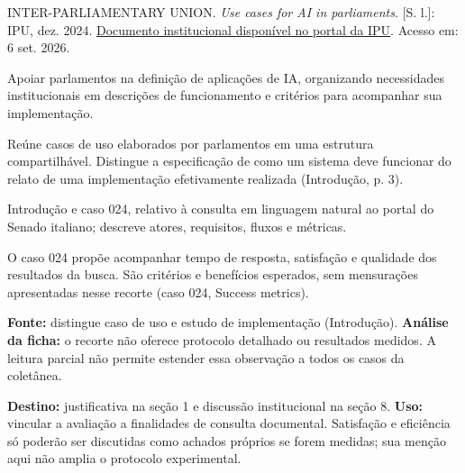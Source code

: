 {\small INTER-PARLIAMENTARY UNION.
\textit{Use cases for AI in parliaments}. [S. l.]: IPU, dez. 2024.
\href{https://www.ipu.org/file/20635/download}{Documento institucional disponível no portal da IPU}. Acesso em: 6 set. 2026.\par}

Apoiar parlamentos na definição de aplicações de IA, organizando necessidades institucionais em descrições de funcionamento e critérios para acompanhar sua implementação.

Reúne casos de uso elaborados por parlamentos em uma estrutura compartilhável. Distingue a especificação de como um sistema deve funcionar do relato de uma implementação efetivamente realizada (Introdução, p. 3).

Introdução e caso 024, relativo à consulta em linguagem natural ao portal do Senado italiano; descreve atores, requisitos, fluxos e métricas.

O caso 024 propõe acompanhar tempo de resposta, satisfação e qualidade dos resultados da busca. São critérios e benefícios esperados, sem mensurações apresentadas nesse recorte (caso 024, Success metrics).

\begin{itemize}
\end{itemize}

\textbf{Fonte:} distingue caso de uso e estudo de implementação (Introdução).
\textbf{Análise da ficha:} o recorte não oferece protocolo detalhado ou resultados medidos. A leitura parcial não permite estender essa observação a todos os casos da coletânea.

\textbf{Destino:} justificativa na seção 1 e discussão institucional na seção 8.
\textbf{Uso:} vincular a avaliação a finalidades de consulta documental. Satisfação e eficiência só poderão ser discutidas como achados próprios se forem medidas; sua menção aqui não amplia o protocolo experimental.

